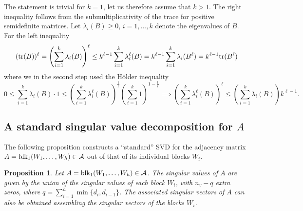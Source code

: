 \documentclass{article}
\makeatletter
\renewenvironment{proof}[1][\proofname]{
  \par\pushQED{\qed}\normalfont
  \topsep6\p@\@plus6\p@\relax
  \trivlist\item[\hskip\labelsep\bfseries#1\@addpunct{.}]
  \ignorespaces
}{
  \popQED\endtrivlist\@endpefalse
}
\newtheorem{proposition}{Proposition}
\def\tr{{\rm tr}}
\def\block{{\rm blk}}
\newcommand{\1}{\mathds{1}}
\makeatother
\begin{document}
\begin{proof}
     The statement is trivial for $k=1$, let us therefore assume that $k>1$. The right inequality follows from the submultiplicativity of the trace for positive semidefinite matrices. Let $\lambda_i(B)\geq 0$, $i=1,...,k$ denote the eigenvalues of $B$. For the left inequality
\begin{equation}
	(\tr{(B)})^\ell = \left(\sum_{i=1}^k \lambda_i(B)\right)^\ell \leq k^{\ell-1}\sum_{i=1}^k \lambda_i^\ell(B) = k^{\ell-1} \sum_{i=1}^k \lambda_i(B^\ell) = k^{\ell-1} \tr{(B^\ell)}
\end{equation}
where we in the second step used the H{\"o}lder inequality
\begin{equation*}
	0\leq\sum_{i=1}^k \lambda_i(B)\cdot 1 \leq \left(\sum_{i=1}^k \lambda_i^\ell(B) \right)^{\frac{1}{\ell}}\left(\sum_{i=1}^k 1 \right)^{1-\frac{1}{\ell}} \implies \left(\sum_{i=1}^k \lambda_i^\ell(B)\right)^\ell \leq \left(\sum_{i=1}^k \lambda_i(B) \right) k^{\ell-1}.
\end{equation*}
\end{proof}




\subsection{A standard singular value decomposition for $A$}
\label{sec:svd}

The following proposition constructs a ``standard'' SVD for the adjacency matrix $ A = \block_1(W_1, \ldots , W_h)\in \mathcal{A} $ out of that of its individual blocks $ W_i $. 

\begin{proposition}
\label{prop:svdA}
Let $ A= \block_1(W_1, \ldots , W_h)\in \mathcal{A} $. The singular values of $A$ are given by the union of the singular values of each block $W_i$, with $n_v-q$ extra zeros, where $q=\sum_{i=1}^{h}\min\{d_i,d_{i-1}\}$.
The associated singular vectors of $A$ can also be obtained assembling the singular vectors of the blocks $ W_i$.
\end{proposition}
\end{document}
